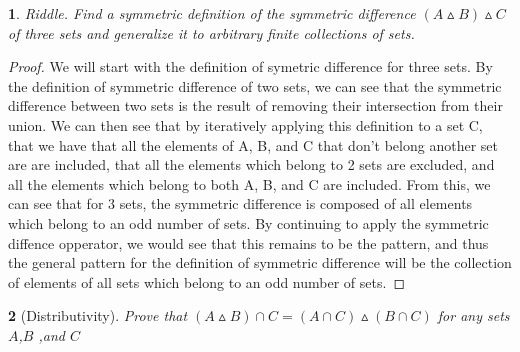 \documentclass{book}
\newtheorem{minorEx}{}[section]
\begin{document}
    \begin{minorEx}%
    Riddle. Find a symmetric definition of the symmetric difference $(A \vartriangle B) \vartriangle C$ of three sets and generalize it to arbitrary finite collections of sets.
   	\end{minorEx}
    \begin{proof}
    We will start with the definition of symetric  difference for three sets. By the definition of symmetric difference of two sets, we can see that the symmetric difference between two sets is the result of removing their intersection from their union. We can then see that by iteratively applying this definition to a set C, that we have that all the elements of A, B, and C that don't belong another set are are included, that all the elements which belong to 2 sets are excluded, and all the elements which belong to both A, B, and C are included. From this, we can see that for 3 sets, the symmetric difference is composed of all elements which belong to an odd number of sets. By continuing to apply the symmetric diffence opperator, we would see that this remains to be the pattern, and thus the general pattern for the definition of symmetric difference will be the collection of elements of all sets which belong to an odd number of sets.
    \end{proof}
    \begin{minorEx}[Distributivity]%
    Prove that $(A \vartriangle B) \cap C = (A \cap C) \vartriangle (B \cap C)$ for any sets $A$,$B$ ,and $C$
   	\end{minorEx}
\end{document}
